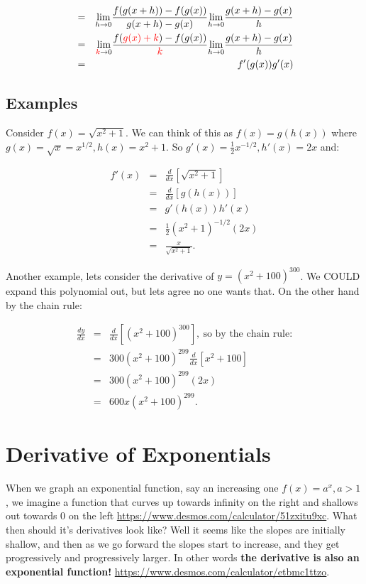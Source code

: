 \begin{eqnarray*}
&=&\displaystyle{ \lim_{h \to 0}}\frac{f(g(x+h))-f(g(x))}{g(x+h)-g(x)}\displaystyle{ \lim_{h \to 0}}\frac{g(x+h)-g(x)}{h}\\
&=&\displaystyle{ \lim_{\textcolor{red}{k} \to 0}}\frac{f(\textcolor{red}{g(x)+k})-f(g(x))}{\textcolor{red}{k}}\displaystyle{ \lim_{h \to 0}}\frac{g(x+h)-g(x)}{h}\\
&=&f'(g(x))g'(x)
\end{eqnarray*}

\subsection{Examples}

Consider $f(x)=\sqrt{x^2+1}$.  We can think of this as $f(x)=g(h(x))$ where $g(x)=\sqrt{x}=x^{1/2}, h(x)=x^2+1$.  So $g'(x)=\frac{1}{2}x^{-1/2}, h'(x)=2x$ and:

\begin{eqnarray*}
f'(x)&=&\frac{d}{dx}[\sqrt{x^2+1}]\\
&=&\frac{d}{dx}[g(h(x))]\\
&=&g'(h(x))h'(x)\\
&=&\frac{1}{2}(x^2+1)^{-1/2}(2x)\\
&=&\frac{x}{\sqrt{x^2+1}}.
\end{eqnarray*}


Another example, lets consider the derivative of $y=(x^2+100)^{300}$.  We COULD expand this polynomial out, but lets agree no one wants that.  On the other hand by the chain rule:

\begin{eqnarray*}
\frac{dy}{dx}&=&\frac{d}{dx}[(x^2+100)^{300}],\ \text{so by the chain rule:}\\
&=&300(x^2+100)^{299}\frac{d}{dx}[x^2+100]\\
&=&300(x^2+100)^{299}(2x)\\
&=&600x(x^2+100)^{299}.
\end{eqnarray*}



\section{Derivative of Exponentials}\label{DerivativeExp}

When we graph an exponential function, say an increasing one $f(x)=a^x, a>1$, we imagine a function that curves up towards infinity on the right and shallows out towards 0 on the left \url{https://www.desmos.com/calculator/51zxitu9xc}.  What then should it's derivatives look like?  Well it seems like the slopes are initially shallow, and then as we go forward the slopes start to increase, and they get progressively and progressively larger.  In other words \textbf{ the derivative is also an exponential function!} \url{https://www.desmos.com/calculator/etbmc1ttzo}.\\

